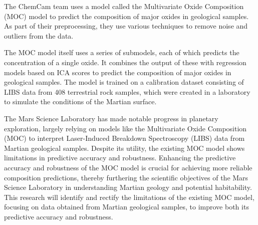 
The ChemCam team uses a model called the Multivariate Oxide Composition (MOC) model to predict the composition of major oxides in geological samples. As part of their preprocessing, they use various techniques to remove noise and outliers from the data.\cite{cleggRecalibrationMarsScience2017}

The MOC model itself uses a series of submodels, each of which predicts the concentration of a single oxide. It combines the output of these with regression models based on ICA scores to predict the composition of major oxides in geological samples.
The model is trained on a calibration dataset consisting of LIBS data from 408 terrestrial rock samples, which were created in a laboratory to simulate the conditions of the Martian surface.\cite{cleggRecalibrationMarsScience2017}

The Mars Science Laboratory has made notable progress in planetary exploration, largely relying on models like the Multivariate Oxide Composition (MOC) to interpret Laser-Induced Breakdown Spectroscopy (LIBS) data from Martian geological samples.
Despite its utility, the existing MOC model shows limitations in predictive accuracy and robustness.
Enhancing the predictive accuracy and robustness of the MOC model is crucial for achieving more reliable composition predictions, thereby furthering the scientific objectives of the Mars Science Laboratory in understanding Martian geology and potential habitability.
This research will identify and rectify the limitations of the existing MOC model, focusing on data obtained from Martian geological samples, to improve both its predictive accuracy and robustness.

